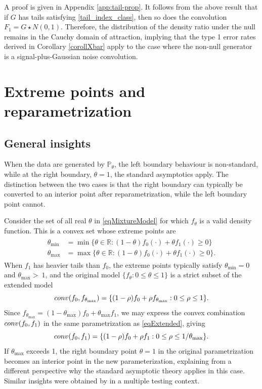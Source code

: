 \documentclass[11pt]{article}
\theoremstyle{definition}
\def\Real{{\mathbb R}}
\def\conv{\mathop{\rm conv}\nolimits}
\begin{document}
A proof is given in Appendix \ref{app:tail-prop}. It follows from the above result that if $G$ has tails satisfying \eqref{tail_index_class}, then so does the convolution $F_1=G \star N(0,1)$. Therefore, the distribution of the density ratio under the null remains in the Cauchy domain of attraction, implying that the type 1 error rates derived in Corollary \ref{corollXbar} apply to the case where the non-null generator is a signal-plus-Gaussian noise convolution.



\section{Extreme points and reparametrization}\label{secParam}

\subsection{General insights}

When the data are generated by $\mathbb{P}_\theta$, the left boundary behaviour is non-standard, while at the right boundary, $\theta=1$, the standard asymptotics apply. The distinction between the two cases is that the right boundary can typically be converted to an interior point after reparametrization, while the left boundary point cannot. 

Consider the set of all real $\theta$ in \eqref{eqMixtureModel} for which $f_\theta$ is a valid density function. This is a convex set whose extreme points are
%
\begin{align}
\begin{split}\label{eq:theta-max}
\theta_{\min} &= \min\{\theta\in\Real : (1-\theta)f_0(\cdot) + \theta f_1(\cdot) \ge 0\} \\
\theta_{\max} &= \max\{\theta\in\Real : (1-\theta)f_0(\cdot) + \theta f_1(\cdot) \ge 0\}.
\end{split}
\end{align}
When $f_1$ has heavier tails than $f_0$, the extreme points typically satisfy $\theta_{\min}=0$ and $\theta_{\max}>~1$, and the original model $\{f_\theta:0\leq \theta\leq 1\}$ is a strict subset of the extended model
%
\begin{equation}\label{eqExtended}
\conv(f_0, f_{\theta_{\max}}) = \{(1-\rho)f_0 + \rho f_{\theta_{\max}} : 0 \leq \rho \leq 1\}.
\end{equation}
%
Since $f_{\theta_{\max}}=(1 - \theta_{\max})f_0 + 	\theta_{\max}f_1$, we may express the convex combination $\conv(f_0, f_1)$ in the same parametrization as \eqref{eqExtended}, giving 
\[
\conv(f_0, f_1) =  \{(1-\rho)f_0 + \rho f_{1} : 0 \leq \rho \leq 1/\theta_{\max}\}.
\]
If $\theta_{\max}$ exceeds 1, the right boundary point $\theta=1$ in the original parametrization becomes an interior point in the new parameterization, explaining from a different perspective why the standard asymptotic theory applies in this case. Similar insights were obtained by \citet{PatraSen2016} in a multiple testing context. 
\end{document}
